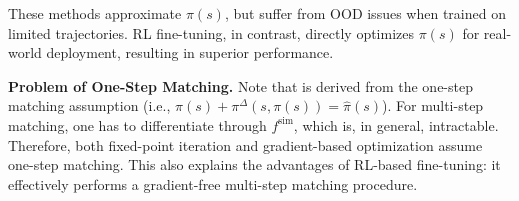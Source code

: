 These methods approximate \(\pi(s)\), but suffer from OOD issues when trained on limited trajectories. RL fine-tuning, in contrast, directly optimizes \(\pi(s)\) for real-world deployment, resulting in superior performance.

\textbf{Problem of One-Step Matching.} Note that  is derived from the one-step matching assumption (i.e., $\pi(s) + \pi^\Delta(s, \pi(s)) = \hat{\pi}(s)$). For multi-step matching, one has to differentiate through $f^\text{sim}$, which is, in general, intractable. Therefore, both fixed-point iteration and gradient-based optimization assume one-step matching. This also explains the advantages of RL-based fine-tuning: it effectively performs a gradient-free multi-step matching procedure.
